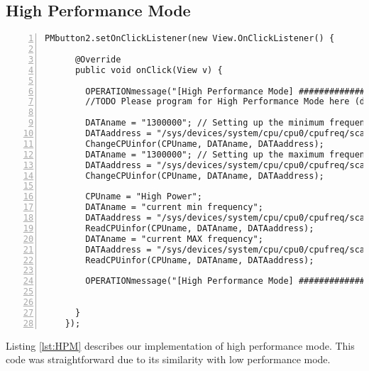 \documentclass{article} %
\begin{document}
\subsection{High Performance Mode}
\begin{lstlisting}[float=*, caption={High Performance Mode},label={lst:HPM},numbers=left]
PMbutton2.setOnClickListener(new View.OnClickListener() {

      @Override
      public void onClick(View v) {

        OPERATIONmessage("[High Performance Mode] ###########################################");
        //TODO Please program for High Performance Mode here (done)

        DATAname = "1300000"; // Setting up the minimum frequency 1300 Mhz
        DATAaddress = "/sys/devices/system/cpu/cpu0/cpufreq/scaling_min_freq";
        ChangeCPUinfor(CPUname, DATAname, DATAaddress);
        DATAname = "1300000"; // Setting up the maximum frequency at 1300 MHz
        DATAaddress = "/sys/devices/system/cpu/cpu0/cpufreq/scaling_max_freq";
        ChangeCPUinfor(CPUname, DATAname, DATAaddress);

        CPUname = "High Power";
        DATAname = "current min frequency";
        DATAaddress = "/sys/devices/system/cpu/cpu0/cpufreq/scaling_min_freq";
        ReadCPUinfor(CPUname, DATAname, DATAaddress);
        DATAname = "current MAX frequency";
        DATAaddress = "/sys/devices/system/cpu/cpu0/cpufreq/scaling_max_freq";
        ReadCPUinfor(CPUname, DATAname, DATAaddress);

        OPERATIONmessage("[High Performance Mode] ###########################################");


      }
    });
\end{lstlisting}
Listing \ref{lst:HPM} describes our implementation of high performance mode. This code was straightforward due to its similarity with low performance mode.
\end{document}
